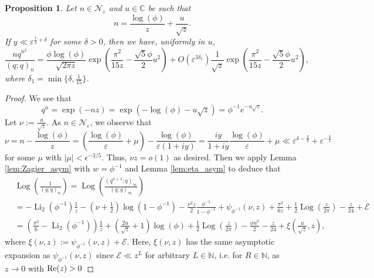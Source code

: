 \documentclass[11pt,reqno]{amsart}
\newtheorem{proposition}[theorem]{Proposition}
\theoremstyle{remark}
\numberwithin{equation}{section}
\def\Log{\operatorname{Log}}
\def\Li{\operatorname{Li}}
\renewcommand{\Re}{{\rm Re}}
\renewcommand{\Re}{{\rm Re}}
\def\Log{\operatorname{Log}}
\def\Li{\operatorname{Li}}
\begin{document}
\begin{proposition}\label{prop:narrow}
	Let $n \in \mathcal{N}_{\varepsilon}$ and $u \in \mathbb{C}$ be such that
	\begin{equation}\label{eq:n_to_u}
		n = \frac{\log (\phi)}{z} + \frac{u}{\sqrt{z}}.
	\end{equation}
	If $y \ll \varepsilon^{\frac13+\delta}$ for some $\delta>0$, then we have, uniformly in $u$,
	\[
		\frac{n q^{n^2}}{(q;q)_n}  =  \frac{\phi \log(\phi) }{\sqrt{2\pi z}}\exp \left( \frac{\pi^2}{15z} - \frac{\sqrt{5}\phi}{2}  u^2   \right) + O\left( \varepsilon^{3\delta_1}\right) \frac{1}{\sqrt{z}} \exp \left( \frac{\pi^2}{15z} - \frac{\sqrt{5}\phi}{2}  u^2   \right),
	\]
	where $\delta_1=\min\{\delta, \frac{1}{15}\}$. 
\end{proposition}
\begin{proof}
We see that
\[
	q^n = \exp \left( -n  z \right) = \exp \left( - \log(\phi ) - u \sqrt{z}  \right) = \phi^{-1} e^{- u \sqrt{z}}.
\]
Let $\nu := \frac{u}{\sqrt{z}}$. As $n \in \mathcal{N}_{\varepsilon}$, we observe that
\begin{equation}\label{eq:nu}
	\nu = n - \frac{\log (\phi)}{z} = \left( \frac{\log (\phi)}{\varepsilon} + \mu \right) - \frac{\log (\phi)}{\varepsilon(1+i y)} = \frac{iy}{1+iy} \frac{\log(\phi)}{\varepsilon} + \mu \ll \varepsilon^{\delta-\frac23} + \varepsilon^{-\frac35} 
\end{equation}
for some $\mu$ with $|\mu|<\epsilon^{-3/5}$.
Thus, $\nu z = o(1)$ as desired. Then we apply Lemma \ref{lem:Zagier_asym} with $w = \phi^{-1}$ and Lemma \ref{lem:eta_asym} to deduce that 
\begin{align*}
	& \Log\left(\frac{1}{(q;q)_n}\right)=\Log \left(\frac{(q^{n+1};q)_\infty}{(q;q)_\infty} \right)\\
	&= - \Li_2 (\phi^{-1}) \frac{1}{z} - \left( \nu + \frac{1}{2} \right) \log(1-\phi^{-1}) - \frac{\nu^2 z}{2} \frac{\phi^{-1}}{1-\phi^{-1}} + \psi_{\phi^{-1}} (\nu, z) +\frac{\pi^{2}}{6z} + \frac{1}{2} \Log\left(\frac{z}{2\pi} \right) - \frac{z}{24} + \mathcal{E}\\
	&= \left(\frac{\pi^2}{6} - \Li_2 (\phi^{-1})\right) \frac{1}{z} +\left( \frac{2u}{\sqrt{z}} + 1 \right) \log(\phi) 
	 + \frac{1}{2} \Log\left(\frac{z}{2\pi} \right) -\frac{\phi u^2}{2} - \frac{z}{24} + \xi \left(\frac{u}{\sqrt{z}}, z \right), 
\end{align*}
where $\xi(\nu,z):=\psi_{\phi^{-1}}(\nu,z) + \mathcal{E}$. Here, $\xi(\nu,z)$ has the same asymptotic expansion as $\psi_{\phi^{-1}}(\nu,z)$ since $\mathcal{E}\ll z^L$ for arbitrary $L \in \mathbb{N}$, i.e. for $R \in \mathbb{N}$, as $z\to 0$ with $\Re(z)>0$

\end{proof}
\end{document}
